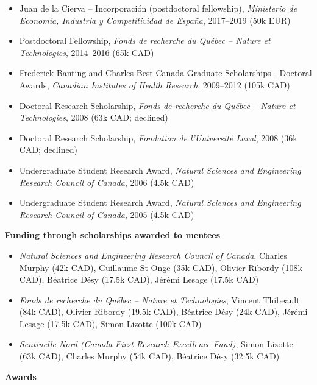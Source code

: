 \documentclass[11pt]{article}
\begin{document}
\begin{itemize}
  \item Juan de la Cierva -- Incorporaci\'on (postdoctoral fellowship), \textit{Ministerio de Econom\'ia, Industria y Competitividad de Espa\~{n}a}, 2017--2019 (50k EUR)
  \item Postdoctoral Fellowship, \textit{Fonds de recherche du Qu\'ebec -- Nature et Technologies}, 2014--2016 (65k CAD)
  \item Frederick Banting and Charles Best Canada Graduate Scholarships - Doctoral Awards, \textit{Canadian Institutes of Health Research}, 2009--2012 (105k CAD)
  \item Doctoral Research Scholarship, \textit{Fonds de recherche du Qu\'ebec -- Nature et Technologies}, 2008 (63k CAD; declined)
  \item Doctoral Research Scholarship, \textit{Fondation de l'Universit\'e Laval}, 2008 (36k CAD; declined)
  \item Undergraduate Student Research Award, \textit{Natural Sciences and Engineering Research Council of Canada}, 2006 (4.5k CAD)
  \item Undergraduate Student Research Award, \textit{Natural Sciences and Engineering Research Council of Canada}, 2005 (4.5k CAD)
\end{itemize}
%
%
%
\pagebreak
\textbf{Funding through scholarships awarded to mentees}
%
\begin{itemize}
  \item \textit{Natural Sciences and Engineering Research Council of Canada}, Charles Murphy (42k CAD), Guillaume St-Onge (35k CAD), Olivier Ribordy (108k CAD), Béatrice Désy (17.5k CAD), Jérémi Lesage (17.5k CAD)
  \item \textit{Fonds de recherche du Qu\'ebec -- Nature et Technologies}, Vincent Thibeault (84k CAD), Olivier Ribordy (19.5k CAD), Béatrice Désy (24k CAD), Jérémi Lesage (17.5k CAD), Simon Lizotte (100k CAD)
  \item \textit{Sentinelle Nord (Canada First Research Excellence Fund)}, Simon Lizotte (63k CAD), Charles Murphy (54k CAD), Béatrice Désy (32.5k CAD)
\end{itemize}
%
%
%
\textbf{Awards}
%
\end{document}
